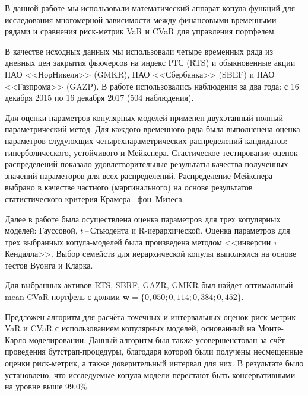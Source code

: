 
В данной работе мы использовали математический аппарат копула-функций для исследования многомерной зависимости между финансовыми временными рядами и сравнения риск-метрик VaR и CVaR для управления портфелем.

В качестве исходных данных мы использовали четыре временных ряда из дневных цен закрытия фьючерсов на индекс РТС (RTS) и обыкновенные акции ПАО <<НорНикеля>> (GMKR), ПАО <<Сбербанка>> (SBEF) и ПАО <<Газпрома>> (GAZP).
В работе использовались наблюдения за два года: с 16 декабря 2015 по 16 декабря 2017 (504 наблюдения).

Для оценки параметров копулярных моделей применен двухэтапный полный параметрический %
метод. %
Для каждого временного ряда была выполненена оценка параметров слудуюхщих четырехпараметрических распределений-кандидатов: гиперболического, устойчивого и Мейкснера.
Стастическое тестирование оценок распределений показало удовлетворительные результаты качества полученных значений параметоров для всех распределений.
Распределение Мейкснера выбрано в качестве частного (маргинального) на основе результатов статистического критерия Крамера\,--\,фон~Мизеса.

Далее в работе была осуществлена оценка параметров для трех копулярных моделей: Гауссовой, $t$\,--\,Стьюдента и R-иерархической.
Оценка параметров для трех выбранных копула-моделей была произведена методом <<инверсии $\tau$ Кендалла>>.
Выбор семейств для иерархической копулы выполнялся на основе тестов Вуонга и Кларка.


Для выбранных активов RTS, SBRF, GAZR, GMKR был найдет оптимальный mean-CVaR-портфель с долями $\textbf{w}=\{0,050; 0,114; 0,384; 0,452\}$.

Предложен алгоритм для расчёта точечных и интервальных оценок риск-метрик VaR и CVaR с использованием копулярных моделей, основанный на Монте-Карло моделировании.
Данный алгоритм был также усовершенстован за счёт проведения бутстрап-процедуры, благодаря которой были получены несмещенные оценки риск-метрик, а также доверительный интервал для них.
В результате было установлено, что исследуемые копула-модели перестают быть консервативными на уровне выше 99.0\%.

